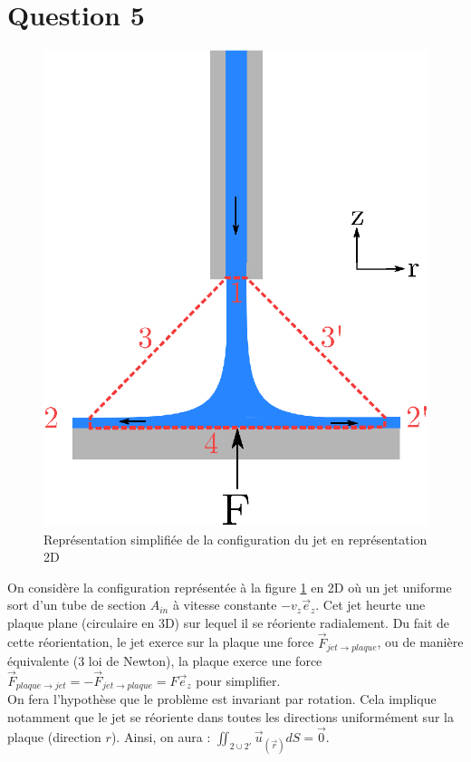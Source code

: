 \section{Question 5\label{section:ex5}}

\begin{figure}[htp]
    \centering
    \includegraphics[width = 0.5\linewidth]{images/FigureExo5.eps}
    \caption{Représentation simplifiée de la configuration du jet en représentation 2D}
    \label{fig:config_exo5}
\end{figure}

On considère la configuration représentée à la figure \ref{fig:config_exo5} en 2D où un jet uniforme sort d'un tube de section $A_{in}$ à vitesse constante $- v_z \vec{e}_z$. Cet jet heurte une plaque plane (circulaire en 3D) sur lequel il se réoriente radialement. Du fait de cette réorientation, le jet exerce sur la plaque une force $\vec{F}_{jet \rightarrow plaque}$, ou de manière équivalente (3 loi de Newton), la plaque exerce une force $\vec{F}_{plaque \rightarrow jet} = - \vec{F}_{jet \rightarrow plaque} = F \vec{e}_z$ pour simplifier. \\

On fera l'hypothèse que le problème est invariant par rotation. Cela implique notamment que le jet se réoriente dans toutes les directions uniformément sur la plaque (direction $r$). Ainsi, on aura : $\iint_{2 \cup 2'} \vec{u}_{(\vec{r})}dS = \vec{0}$.\\


